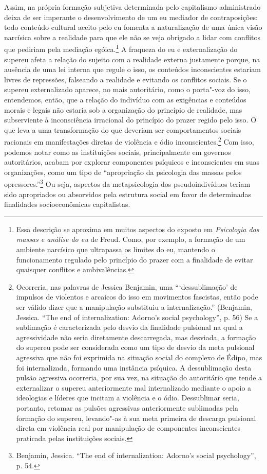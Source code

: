 Assim, na própria formação subjetiva determinada pelo capitalismo
administrado deixa de ser imperante o desenvolvimento de um eu mediador
de contraposições: todo conteúdo cultural aceito pelo eu fomenta a
naturalização de uma única visão narcísica sobre a realidade para que
ele não se veja obrigado a lidar com conflitos que pediriam pela
mediação egóica.\footnote{Essa descrição se aproxima em muitos aspectos
  do exposto em \emph{Psicologia das massas e análise do eu} de Freud.
  Como, por exemplo, a formação de um ambiente narcísico que ultrapassa
  os limites do eu, mantendo o funcionamento regulado pelo princípio do
  prazer com a finalidade de evitar quaisquer conflitos e ambivalências.}
A fraqueza do eu e externalização do supereu afeta a relação do sujeito
com a realidade externa justamente porque, na ausência de uma lei
interna que regule o isso, os conteúdos inconscientes estariam livres de
repressões, falseando a realidade e evitando os conflitos sociais. Se o
supereu externalizado aparece, no mais autoritário, como o porta"-voz do
isso, entendemos, então, que a relação do indivíduo com as exigências e
conteúdos morais e legais não estaria sob a organização do princípio de
realidade, mas subserviente à inconsciência irracional do princípio do
prazer regido pelo isso. O que leva a uma transformação do que deveriam
ser comportamentos sociais racionais em manifestações diretas de
violência e ódio inconscientes.\footnote{Ocorreria, nas palavras de
  Jessica Benjamin, uma ```dessublimação' de impulsos de violentos e
  arcaicos do isso em movimentos fascistas, então pode ser válido dizer
  que a manipulação substituiu a internalização.'' (Benjamin, Jessica.
  ``The end of internalization: Adorno's social psychology'', p. 56) Se
  a sublimação é caracterizada pelo desvio da finalidade pulsional na
  qual a agressividade não seria diretamente descarregada, mas desviada,
  a formação do supereu pode ser considerada como um tipo de desvio da
  meta pulsional agressiva que não foi exprimida na situação social do
  complexo de Édipo, mas foi internalizada, formando uma instância
  psíquica. A dessublimação desta pulsão agressiva ocorreria, por sua
  vez, na situação do autoritário que tende a externalizar o supereu
  anteriormente mal internalizado mediante o apoio a ideologias e
  líderes que incitam a violência e o ódio. Dessublimar seria, portanto,
  retomar as pulsões agressivas anteriormente sublimadas pela formação
  do supereu, levando"-as à sua meta primeira de descarga pulsional
  direta em violência real por manipulação de componentes inconscientes
  praticada pelas instituições sociais.} Com isso, podemos notar como
as instituições sociais, principalmente em governos autoritários, acabam
por explorar componentes psíquicos e inconscientes em suas organizações,
como um tipo de ``apropriação da psicologia das massas pelos
opressores.''\footnote{Benjamin, Jessica. ``The end of internalization:
  Adorno's social psychology'', p. 54.} Ou seja, aspectos da
metapsicologia dos pseudoindivíduos teriam sido apropriados ou
absorvidos pela estrutura social em favor de determinadas finalidades
socioeconômicas capitalistas.


